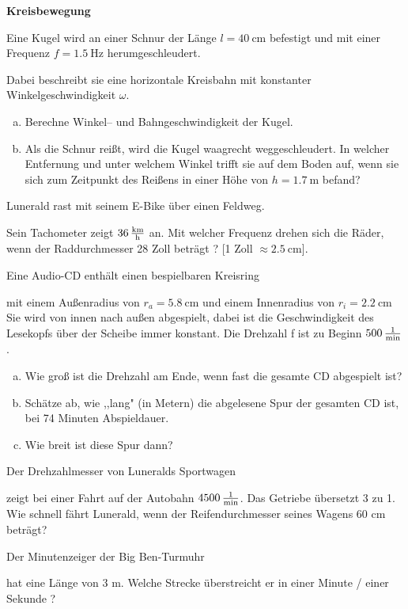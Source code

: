 \documentclass[a4paper]{article}
\begin{document}
{\bf Kreisbewegung}
\begin{enumerate}[1.]

{\bf \item Eine Kugel wird an einer Schnur der Länge $l=\SI{40}{\centi\meter}$ befestigt und mit einer Frequenz 
$f=\SI{1,5}{\hertz}$ herumgeschleudert.} Dabei beschreibt sie eine horizontale Kreisbahn mit konstanter Winkelgeschwindigkeit $\omega$. 

\begin{enumerate}[a)]
\item Berechne Winkel-- und Bahngeschwindigkeit der Kugel.
\item Als die Schnur reißt, wird die Kugel waagrecht weggeschleudert. In welcher Entfernung und unter welchem Winkel trifft sie auf dem Boden auf, wenn sie sich zum Zeitpunkt des Reißens in einer Höhe von $h=\SI{1,7}{\meter}$ befand?
\end{enumerate}

{\bf \item Lunerald rast mit seinem E-Bike  über einen Feldweg.} Sein Tachometer  zeigt $\SI{36}{\kilo\meter\over \hour}$ an. Mit welcher Frequenz drehen sich die Räder, wenn der Raddurchmesser 28 Zoll beträgt ? 
[1 Zoll $\approx \SI{2,5}{\centi\meter}$].

{\bf \item Eine Audio-CD enthält einen bespielbaren Kreisring} mit einem Außenradius von $r_a=\SI{5,8}{\centi\meter}$ und einem Innenradius von $r_i=\SI{2,2}{\centi\meter}$ Sie wird von innen nach außen abgespielt, dabei ist die Geschwindigkeit des Lesekopfs über der Scheibe immer konstant. Die Drehzahl f ist zu Beginn $\SI{500}{1\over\minute}$. 
\begin{enumerate}[a)]
	\item Wie groß ist die Drehzahl am Ende, wenn fast die gesamte CD abgespielt ist?
	\item Schätze ab, wie ,,lang" (in Metern) die abgelesene Spur der gesamten CD ist, bei 74 Minuten Abspieldauer. 
	\item Wie breit ist diese Spur dann? 
\end{enumerate}


{\bf \item Der Drehzahlmesser von Luneralds Sportwagen} zeigt bei einer Fahrt auf der Autobahn  $\SI{4500}{1\over\minute}$. Das Getriebe übersetzt 3 zu 1. Wie schnell fährt Lunerald, wenn der Reifendurchmesser seines Wagens 60 cm beträgt?

{\bf \item Der Minutenzeiger der Big Ben-Turmuhr } hat eine Länge von 3 m. Welche Strecke überstreicht er in einer Minute / einer Sekunde ?


\end{enumerate}
\end{document}
